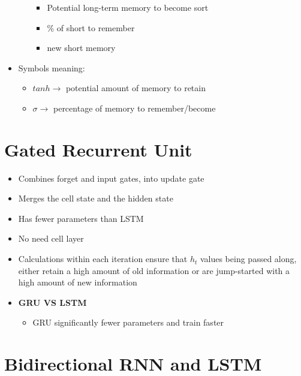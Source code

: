 \begin{itemize}
\begin{itemize}
        \begin{itemize}
            \item Potential long-term memory to become sort
            \item \% of short to remember
            \item new short memory
        \end{itemize}
    \end{itemize}
    \item Symbols meaning:
    \begin{itemize}
        \item \(tanh \rightarrow\) potential amount of memory to retain 
        \item \(\sigma \rightarrow\) percentage of memory to remember/become 
    \end{itemize}
\end{itemize}

\section{Gated Recurrent Unit}
\begin{itemize}
    \item Combines forget and input gates, into update gate
    \item Merges the cell state and the hidden state
    \item Has fewer parameters than LSTM
    \item No need cell layer
    \item Calculations within each iteration ensure that \(h_t\) values being passed along, either retain a high amount of old information or are jump-started with a high amount of new information
    \item \textbf{GRU VS LSTM}
    \begin{itemize}
        \item GRU significantly fewer parameters and train faster
    \end{itemize}
\end{itemize}

\section{Bidirectional RNN and LSTM}
